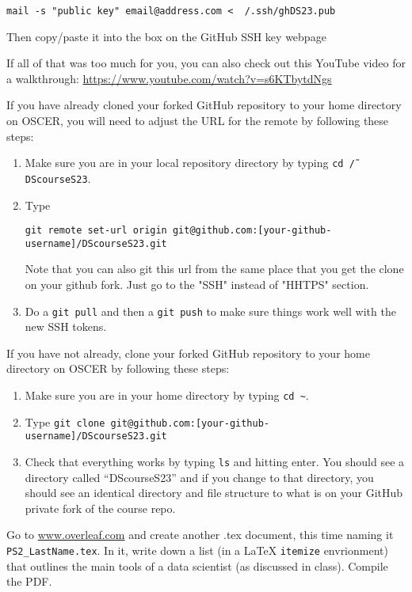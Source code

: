 \documentclass[12pt,english]{exam}
\begin{document}
\begin{questions}
\begin{enumerate}
\begin{itemize}
        \texttt{mail -s "public key" email@address.com < ~/.ssh/ghDS23.pub}

        Then copy/paste it into the box on the GitHub SSH key webpage
    \end{itemize}
\end{enumerate}

    If all of that was too much for you, you can also check out this YouTube video for a walkthrough: \url{https://www.youtube.com/watch?v=s6KTbytdNgs}

\question If you have already cloned your forked GitHub repository to your home directory on OSCER, you will need to adjust the URL for the remote by following these steps:
\begin{enumerate}
    \item Make sure you are in your local repository directory by typing \texttt{cd \~/DScourseS23}.
    \item Type 
        
        \texttt{git remote set-url origin git@github.com:[your-github-username]/DScourseS23.git}

        Note that you can also git this url from the same place that you get the clone on your github fork. Just go to the "SSH" instead of "HHTPS" section.
    \item Do a \texttt{git pull} and then a \texttt{git push} to make sure things work well with the new SSH tokens.
\end{enumerate}

\question If you have not already, clone your forked GitHub repository to your home directory on OSCER by following these steps:
\begin{enumerate}
    \item Make sure you are in your home directory by typing \texttt{cd \~}.
    \item Type \texttt{git clone git@github.com:[your-github-username]/DScourseS23.git}
    \item Check that everything works by typing \texttt{ls} and hitting enter. You should see a directory called ``DScourseS23'' and if you change to that directory, you should see an identical directory and file structure to what is on your GitHub private fork of the course repo.
\end{enumerate}

\question Go to \url{www.overleaf.com} and create another .tex document, this time naming it \texttt{PS2\_LastName.tex}. In it, write down a list (in a LaTeX \texttt{itemize} envrionment) that outlines the main tools of a data scientist (as discussed in class). Compile the PDF.


\end{questions}
\end{document}
